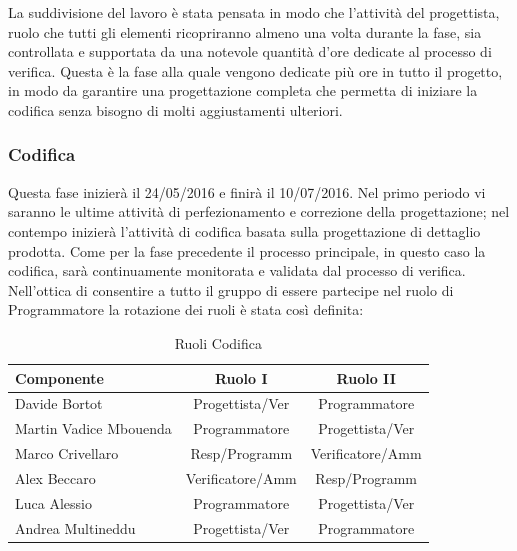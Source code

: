 \documentclass[a4paper,11pt]{article}
\begin{document}
		La suddivisione del lavoro è stata pensata in modo che l'attività del progettista, ruolo che tutti gli elementi ricopriranno almeno una volta durante la fase, sia controllata e supportata da una notevole quantità d'ore dedicate al processo di verifica. Questa è la fase alla quale vengono dedicate più ore in tutto il progetto, in modo da garantire una progettazione completa che permetta di iniziare la codifica senza bisogno di molti aggiustamenti ulteriori.
		\newpage
		\subsubsection{Codifica}
		Questa fase inizierà il 24/05/2016 e finirà il 10/07/2016. Nel primo periodo vi saranno le ultime attività di perfezionamento e correzione della progettazione; nel contempo inizierà l'attività di codifica basata sulla progettazione di dettaglio prodotta. Come per la fase precedente il processo principale, in questo caso la codifica, sarà continuamente monitorata e validata dal processo di verifica. Nell'ottica di consentire a tutto il gruppo di essere partecipe nel ruolo di Programmatore la rotazione dei ruoli è stata così definita:
		\begin{table}[h!]			
		\begin{center}
			\begin{tabular}{l c c}
			\textbf{Componente} & \textbf{Ruolo I} & \textbf{Ruolo II} \\
			\midrule
			Davide Bortot & Progettista/Ver & Programmatore\\
			Martin Vadice Mbouenda & Programmatore & Progettista/Ver\\
			Marco Crivellaro & Resp/Programm & Verificatore/Amm\\
			Alex Beccaro & Verificatore/Amm & Resp/Programm\\
			Luca Alessio & Programmatore  & Progettista/Ver\\
			Andrea Multineddu & Progettista/Ver & Programmatore\\
			\midrule
			\end{tabular}
		\end{center}
		\caption{Ruoli Codifica}
		\end{table}
		
\end{document}
